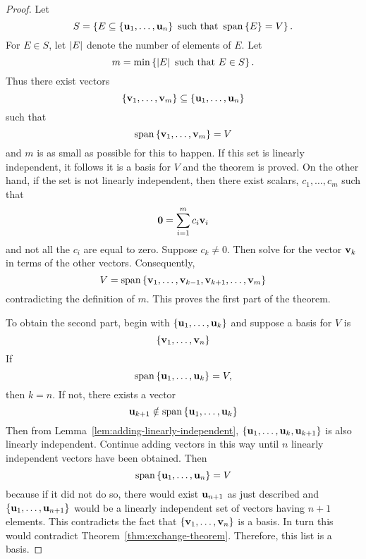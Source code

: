 \begin{proof}Let
\begin{equation*}
S=\set{E\subseteq \set{\vect{u}_{1},\ldots,\vect{u}_{n}}\text{ such that }%
\sspan\set{E} =V}.
\end{equation*}
For $E\in S$, let $\left|E\right|$ denote the number of elements
of $E$. Let
\begin{equation*}
m= \min \set{\abs{E}\text{ such that }E\in S}.
\end{equation*}
Thus there exist vectors
\begin{equation*}
\set{\vect{v}_{1},\ldots,\vect{v}_{m}}\subseteq \set{\vect{u}_{1},\ldots,%
\vect{u}_{n}}
\end{equation*}
such that
\begin{equation*}
\sspan\set{\vect{v}_{1},\ldots,\vect{v}_{m}} =V
\end{equation*}
and $m$ is as small as possible for this to happen. If this set is linearly
independent, it follows it is a basis for $V$ and the theorem is proved. On
the other hand, if the set is not linearly independent, then there exist
scalars, $c_{1},\ldots,c_{m}$ such that
\begin{equation*}
\mbox{\bf 0}=\sum_{i=1}^{m}c_{i}\mbox{\bf v}_{i}
\end{equation*}
and not all the $c_{i}$ are equal to zero. Suppose $c_{k}\neq 0$. Then solve for the
vector $\mbox{\bf v}_{k}$ in terms of the other vectors.
Consequently,
\begin{equation*}
V=\sspan\set{\vect{v}_{1},\ldots,\vect{v}_{k-1},\vect{v}
_{k+1},\ldots,\vect{v}_{m}}
\end{equation*}
contradicting the definition of $m$. This proves the first part of the
theorem.

To obtain the second part, begin with $\left\{\mbox{\bf u}_{1},\ldots,\mbox{\bf u}
_{k}\right\}$ and suppose a basis for $V$ is
\begin{equation*}
\left\{\mbox{\bf v}_{1},\ldots,\mbox{\bf v}_{n}\right\}
\end{equation*}
If
\begin{equation*}
\sspan\set{\vect{u}_{1},\ldots,\vect{u}_{k}} =V,
\end{equation*}
then $k=n$. If not, there exists a vector
\begin{equation*}
\vect{u}_{k+1}\notin \sspan\set{\vect{u}_{1},\ldots,\vect{u}
_{k}}
\end{equation*}
Then from Lemma~\ref{lem:adding-linearly-independent}, $\left\{\mbox{\bf u}_{1},\ldots,\mbox{\bf u}_{k},
\mbox{\bf u}_{k+1}\right\}$ is also linearly independent. Continue adding vectors in
this way until $n$ linearly independent vectors have been obtained. Then
\begin{equation*}
\sspan\set{\vect{u}_{1},\ldots,\vect{u}_{n}} =V
\end{equation*}
because if it did not do so, there would exist $\mbox{\bf u}_{n+1}$ as just
described and $\left\{\mbox{\bf u}_{1},\ldots,\mbox{\bf u}_{n+1}\right\} $
would be a linearly independent set of vectors having $n+1$ elements. This contradicts the fact that $\left\{\mbox{\bf v}_{1},\ldots,\mbox{\bf v}_{n}\right\} $ is a basis.
 In turn this would contradict Theorem~\ref{thm:exchange-theorem}. Therefore, this list is a
basis.
\end{proof}

